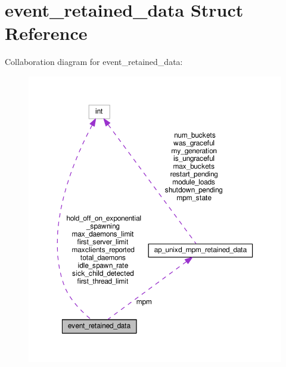 \hypertarget{structevent__retained__data}{}\section{event\+\_\+retained\+\_\+data Struct Reference}
\label{structevent__retained__data}


Collaboration diagram for event\+\_\+retained\+\_\+data\+:
\nopagebreak
\begin{figure}[H]
\begin{center}
\leavevmode
\includegraphics[width=350pt]{structevent__retained__data__coll__graph}
\end{center}
\end{figure}
